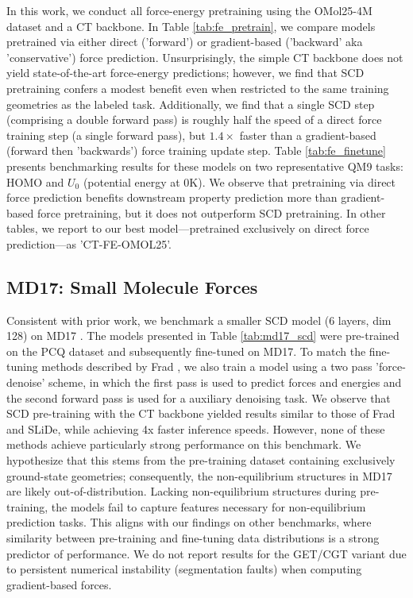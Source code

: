 In this work, we conduct all force-energy pretraining using the OMol25-4M dataset and a CT backbone. In Table \ref{tab:fe_pretrain}, we compare models pretrained via either direct ('forward') or gradient-based ('backward' aka 'conservative') force prediction. Unsurprisingly, the simple CT backbone does not yield state-of-the-art force-energy predictions; however, we find that SCD pretraining confers a modest benefit even when restricted to the same training geometries as the labeled task. Additionally, we find that a single SCD step (comprising a double forward pass) is roughly half the speed of a direct force training step (a single forward pass), but $1.4\times$ faster than a gradient-based (forward then 'backwards') force training update step. Table \ref{tab:fe_finetune} presents benchmarking results for these models on two representative QM9 tasks: HOMO and $U_0$ (potential energy at 0K). We observe that pretraining via direct force prediction benefits downstream property prediction more than gradient-based force pretraining, but it does not outperform SCD pretraining. In other tables, we report to our best model—pretrained exclusively on direct force prediction—as 'CT-FE-OMOL25'.






\subsection{MD17: Small Molecule Forces}

Consistent with prior work, we benchmark a smaller SCD model (6 layers, dim 128) on MD17 \cite{md17_chmiela2017machine}. The models presented in Table \ref{tab:md17_scd} were pre-trained on the PCQ dataset and subsequently fine-tuned on MD17. To match the fine-tuning methods described by Frad \cite{Frad_Ni2024}, we also train a model using a two pass 'force-denoise' scheme, in which the first pass is used to predict forces and energies and the second forward pass is used for a auxiliary denoising task. We observe that SCD pre-training with the CT backbone yielded results similar to those of Frad and SLiDe, while achieving 4x faster inference speeds. However, none of these methods achieve particularly strong performance on this benchmark. We hypothesize that this stems from the pre-training dataset containing exclusively ground-state geometries; consequently, the non-equilibrium structures in MD17 are likely out-of-distribution. Lacking non-equilibrium structures during pre-training, the models fail to capture features necessary for non-equilibrium prediction tasks. This aligns with our findings on other benchmarks, where similarity between pre-training and fine-tuning data distributions is a strong predictor of performance. We do not report results for the GET/CGT variant due to persistent numerical instability (segmentation faults) when computing gradient-based forces.

